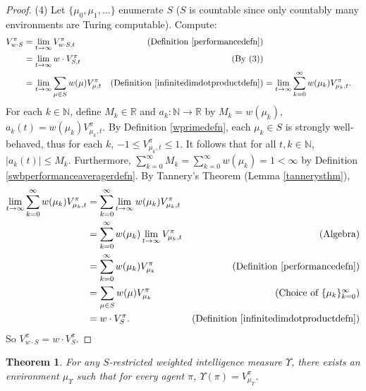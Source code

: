 \documentclass[twoside]{article}
\newtheorem{theorem}{Theorem}
\begin{document}
\begin{proof}
    (4) Let $\{\mu_0,\mu_1,\ldots\}$ enumerate $S$ ($S$ is countable since
    only countably many environments are Turing computable). Compute:
    \begin{align*}
        V^\pi_{w\cdot S}
            &= \lim_{t\to\infty} V^\pi_{w\cdot S,t}
                &\mbox{(Definition \ref{performancedefn})}\\
            &= \lim_{t\to\infty} w\cdot V^\pi_{S,t}
                &\mbox{(By (3))}\\
            &= \lim_{t\to\infty} \sum_{\mu\in S}w(\mu)V^\pi_{\mu,t}
                &\mbox{(Definition \ref{infinitedimdotproductdefn})}
            &= \lim_{t\to\infty} \sum_{k=0}^\infty w(\mu_k)V^\pi_{\mu_k,t}.
    \end{align*}
    For each $k\in\mathbb N$, define $M_k\in\mathbb R$ and $a_k:\mathbb N\to\mathbb R$
    by $M_k=w(\mu_k)$, $a_k(t)=w(\mu_k)V^\pi_{\mu_k,t}$.
    By Definition \ref{wprimedefn}, each $\mu_k\in S$ is strongly well-behaved,
    thus for each $k$, $-1\leq V^\pi_{\mu_k,t}\leq 1$.
    It follows that for all $t,k\in\mathbb N$, $|a_k(t)|\leq M_k$.
    Furthermore, $\sum_{k=0}^\infty M_k=\sum_{k=0}^\infty w(\mu_k)=1<\infty$
    by Definition \ref{swbperformanceaveragerdefn}.
    By Tannery's Theorem (Lemma \ref{tannerysthm}),
    \begin{align*}
        \lim_{t\to\infty} \sum_{k=0}^\infty w(\mu_k)V^\pi_{\mu_k,t}
            &= \sum_{k=0}^\infty\lim_{t\to\infty} w(\mu_k)V^\pi_{\mu_k,t}\\
            &= \sum_{k=0}^\infty w(\mu_k)\lim_{t\to\infty} V^\pi_{\mu_k,t}
                &\mbox{(Algebra)}\\
            &= \sum_{k=0}^\infty w(\mu_k)V^\pi_{\mu_k}
                &\mbox{(Definition \ref{performancedefn})}\\
            &= \sum_{\mu\in S} w(\mu)V^\pi_{\mu_k}
                &\mbox{(Choice of $\{\mu_k\}_{k=0}^\infty$)}\\
            &= w\cdot V^\pi_{S}.
                &\mbox{(Definition \ref{infinitedimdotproductdefn})}
    \end{align*}
    So $V^\pi_{w\cdot S}=w\cdot V^\pi_{S}$.
\end{proof}

\begin{theorem}
    For any $S$-restricted weighted intelligence measure $\Upsilon$,
    there exists an environment $\mu_\Upsilon$ such that for every agent $\pi$,
    $\Upsilon(\pi)=V^\pi_{\mu_\Upsilon}$.
\end{theorem}
\end{document}
